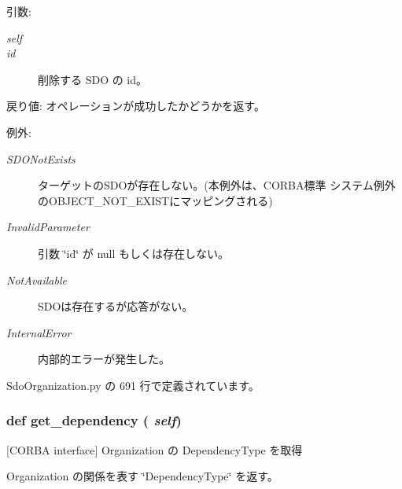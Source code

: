 \begin{Desc}
\item[引数:]
\begin{description}
\item[{\em self}]\item[{\em id}]削除する SDO の id。\end{description}
\end{Desc}
\begin{Desc}
\item[戻り値:]オペレーションが成功したかどうかを返す。\end{Desc}
\begin{Desc}
\item[例外:]
\begin{description}
\item[{\em SDONotExists}]ターゲットのSDOが存在しない。(本例外は、CORBA標準 システム例外のOBJECT\_\-NOT\_\-EXISTにマッピングされる) \item[{\em InvalidParameter}]引数 \char`\"{}id\char`\"{} が null もしくは存在しない。 \item[{\em NotAvailable}]SDOは存在するが応答がない。 \item[{\em InternalError}]内部的エラーが発生した。 \end{description}
\end{Desc}


 SdoOrganization.py の 691 行で定義されています。
\subsubsection{\setlength{\rightskip}{0pt plus 5cm}def get\_\-dependency ( {\em self})}\label{classsource__py_1_1_sdo_organization_1_1_organization__impl_e68b16ea090b26e8f333c78ee91b2d60}


[CORBA interface] Organization の DependencyType を取得 

Organization の関係を表す \char`\"{}DependencyType\char`\"{} を返す。

